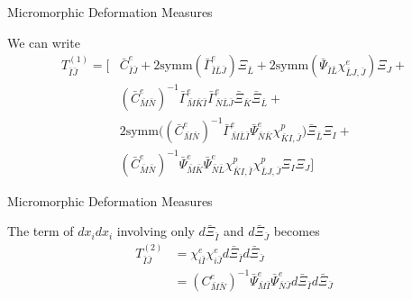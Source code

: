 \documentclass[11pt]{beamer}
\begin{document}
\begin{frame}{Micromorphic Deformation Measures}

We can write
\begin{align*}
T_{\bar{I}\bar{J}}^{(1)} = \bigg[& \bar{C}_{\bar{I}\bar{J}}^e + 2\text{symm}\left(\bar{\Gamma}_{\bar{I}\bar{L}\bar{J}}^e\right)\Xi_{\bar{L}} + 2\text{symm}\left(\bar{\Psi}_{\bar{I}\bar{L}} \chi_{\bar{L}J,\bar{J}}^e\right)\Xi_J +\\
&\left(\bar{C}_{\bar{M}\bar{N}}^e\right)^{-1} \bar{\Gamma}_{\bar{M}\bar{K}\bar{I}}^e  \bar{\Gamma}_{\bar{N}\bar{L}\bar{J}}^e\bar{\Xi}_{\bar{K}} \bar{\Xi}_{\bar{L}} +\\
&2\text{symm}\bigg(\left(\bar{C}_{\bar{M}\bar{N}}^e\right)^{-1}\bar{\Gamma}_{\bar{M}\bar{L}\bar{I}}^e \bar{\Psi}_{\bar{N}\bar{K}}^e\chi_{\bar{K}I,\bar{J}}^p\bigg)\bar{\Xi}_{\bar{L}}\Xi_I +\\
& \left(\bar{C}_{\bar{M}\bar{N}}^e\right)^{-1} \bar{\Psi}_{\bar{M}\bar{K}}^e \bar{\Psi}_{\bar{N}\bar{L}}^e\chi_{\bar{K}I,\bar{I}}^p \chi_{\bar{L}J,\bar{J}}^p \Xi_I\Xi_J\bigg]%
\end{align*}

\end{frame}

\begin{frame}{Micromorphic Deformation Measures}

The term of $dx_i dx_i$ involving only $d\bar{\Xi}_{\bar{I}}$ and $d\bar{\Xi}_{\bar{J}}$ becomes
\begin{align*}
T_{\bar{I}\bar{J}}^{(2)} &= \chi_{i\bar{I}}^e \chi_{i\bar{J}}^e d\bar{\Xi}_{\bar{I}}d\bar{\Xi}_{\bar{J}}\\
&= \left(C_{\bar{M}\bar{N}}^e\right)^{-1} \bar{\Psi}_{\bar{M}\bar{I}}^e \bar{\Psi}_{\bar{N}\bar{J}}^e d\bar{\Xi}_{\bar{I}}d\bar{\Xi}_{\bar{J}}\\
\end{align*}

\end{frame}
\end{document}
